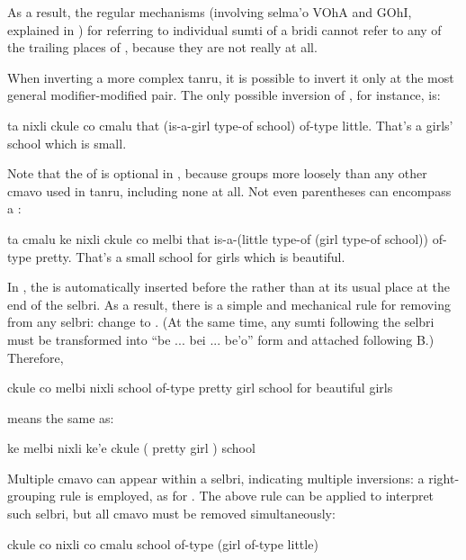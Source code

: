 As a result, the regular mechanisms (involving selma'o VOhA
    and GOhI, explained in ) for
    referring to individual sumti of a bridi cannot refer to any of
    the trailing places of , because
    they are not really  at all.

When inverting a more complex tanru, it is possible to
    invert it only at the most general modifier-modified pair. The
    only possible inversion of , for
    instance, is:
\begin{example}
ta nixli  ckule co cmalu\n
that (is-a-girl type-of school) of-type little.\n
That's a girls' school which is small.
\end{example}

Note that the  of  is
    optional in , because 
    groups more loosely than any other cmavo used in tanru,
    including none at all. Not even  parentheses can
    encompass a :
\begin{example}
ta cmalu ke nixli ckule \n
\T	co melbi\n
that is-a-(little type-of (girl type-of school))\n
\T	of-type pretty.\n
That's a small school for girls which is beautiful.
\end{example}

In , the  is
    automatically inserted before the  rather than at its
    usual place at the end of the selbri. As a result, there is a
    simple and mechanical rule for removing  from any selbri:
    change  to . (At the same time, any
    sumti following the selbri must be transformed into ``be ...
    bei ... be'o'' form and attached following B.) Therefore,
\begin{example}
ckule co melbi nixli\n
school of-type pretty girl\n
school for beautiful girls
\end{example}

{\noindent}means the same as:
\begin{example}
ke melbi nixli ke'e ckule\n
( pretty girl ) school
\end{example}

Multiple  cmavo can appear within a selbri, indicating
    multiple inversions: a right-grouping rule is employed, as for
    . The above rule can be applied to interpret such selbri,
    but all  cmavo must be removed simultaneously:
\begin{example}
ckule co nixli co cmalu\n
school of-type (girl of-type little)
\end{example}


